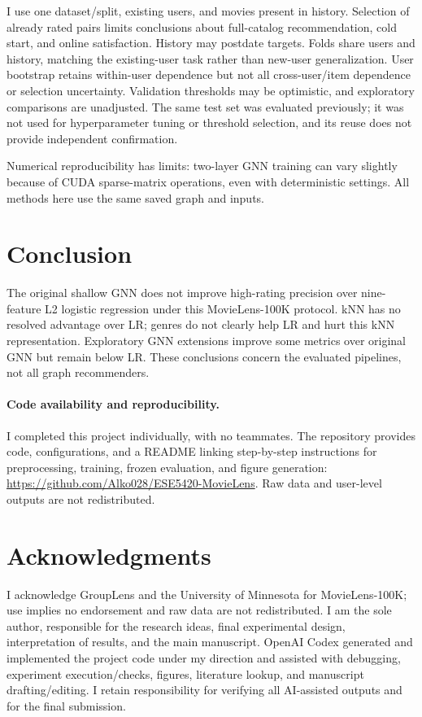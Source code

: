 \documentclass{article}
\begin{document}
I use one dataset/split, existing users, and movies present in history. Selection of already rated pairs limits conclusions about full-catalog recommendation, cold start, and online satisfaction. History may postdate targets. Folds share users and history, matching the existing-user task rather than new-user generalization. User bootstrap retains within-user dependence but not all cross-user/item dependence or selection uncertainty. Validation thresholds may be optimistic, and exploratory comparisons are unadjusted. The same test set was evaluated previously; it was not used for hyperparameter tuning or threshold selection, and its reuse does not provide independent confirmation.

Numerical reproducibility has limits: two-layer GNN training can vary slightly because of CUDA sparse-matrix operations, even with deterministic settings. All methods here use the same saved graph and inputs.

\section{Conclusion}
The original shallow GNN does not improve high-rating precision over nine-feature L2 logistic regression under this MovieLens-100K protocol. kNN has no resolved advantage over LR; genres do not clearly help LR and hurt this kNN representation. Exploratory GNN extensions improve some metrics over original GNN but remain below LR. These conclusions concern the evaluated pipelines, not all graph recommenders.

\newpage
\paragraph{Code availability and reproducibility.}
I completed this project individually, with no teammates. The repository provides code, configurations, and a README linking step-by-step instructions for preprocessing, training, frozen evaluation, and figure generation: \url{https://github.com/Alko028/ESE5420-MovieLens}. Raw data and user-level outputs are not redistributed.

\section*{Acknowledgments}
I acknowledge GroupLens and the University of Minnesota for MovieLens-100K; use implies no endorsement and raw data are not redistributed. I am the sole author, responsible for the research ideas, final experimental design, interpretation of results, and the main manuscript. OpenAI Codex generated and implemented the project code under my direction and assisted with debugging, experiment execution/checks, figures, literature lookup, and manuscript drafting/editing. I retain responsibility for verifying all AI-assisted outputs and for the final submission.
\end{document}
